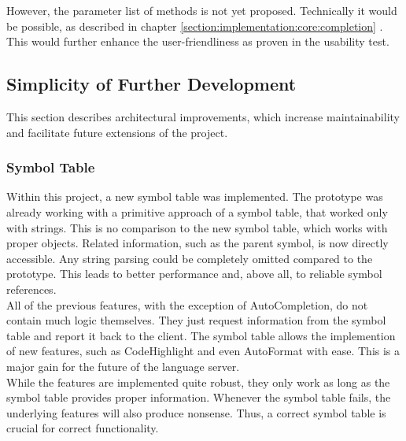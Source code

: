 However, the parameter list of methods is not yet proposed.
Technically it would be possible, as described in chapter
\ref{section:implementation:core:completion} .
This would further enhance the user-friendliness as proven in the usability test.

\subsection{Simplicity of Further Development}
This section describes architectural improvements,
which increase maintainability and facilitate future extensions of the project.

\subsubsection{Symbol Table}
Within this project, a new symbol table was implemented.
The prototype was already working with a primitive approach of a symbol table, that worked only with strings.
This is no comparison to the new symbol table, which works with proper objects.
Related information, such as the parent symbol, is now directly accessible.
Any string parsing could be completely omitted compared to the prototype.
This leads to better performance and, above all, to reliable symbol references.\\

All of the previous features, with the exception of AutoCompletion, do not contain much logic themselves.
They just request information from the symbol table and report it back to the client.
The symbol table allows the implemention of new features, such as CodeHighlight and even AutoFormat with ease.
This is a major gain for the future of the language server.\\


While the features are implemented quite robust, they only work as long as the symbol table provides proper information.
Whenever the symbol table fails, the underlying features will also produce nonsense.
Thus, a correct symbol table is crucial for correct functionality.\\

